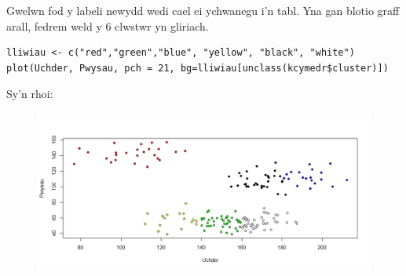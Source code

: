 Gwelwn fod y labeli newydd wedi cael ei ychwanegu i'n tabl. Yna gan blotio graff arall, fedrem weld y 6 clwstwr yn gliriach.

\begin{verbatim}
lliwiau <- c("red","green","blue", "yellow", "black", "white")
plot(Uchder, Pwysau, pch = 21, bg=lliwiau[unclass(kcymedr$cluster)])
\end{verbatim}

Sy'n rhoi:

\begin{figure}[H]
\begin{center}
\includegraphics[width=0.5\linewidth]{../img/6clwstwrR.jpeg}
\end{center}
\end{figure}


